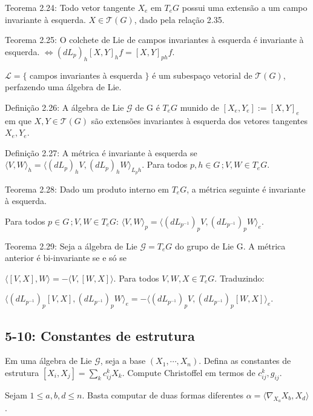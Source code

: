 \documentclass[12pt]{article}
\begin{document}
		Teorema 2.24: Todo vetor tangente $X_e$ em $T_eG$ possui uma extens\~ao a um campo invariante \`a esquerda. $X \in \mathcal{T}(G)$, dado pela rela\c{c}\~ao 2.35.

		Teorema 2.25: O colchete de Lie de campos invariantes \`a esquerda \'e invariante \`a esquerda. $\Leftrightarrow (dL_p)_h [X,Y]_h f = [X,Y]_{ph} f$.

		$\mathcal{L} = \{$ campos invariantes \`a esquerda $\}$ \'e um subespa\c{c}o vetorial de $\mathcal{T}(G)$, perfazendo uma \'algebra de Lie.

		Defini\c{c}\~ao 2.26: A \'algebra de Lie $\mathcal{G}$ de G \'e $T_eG$ munido de $[X_e, Y_e] := [X,Y]_e$ em que $X, Y \in \mathcal{T}(G)$ s\~ao extens\~oes invariantes \`a esquerda dos vetores tangentes $X_e, Y_e$.

		Defini\c{c}\~ao 2.27: A m\'etrica \'e invariante \`a esquerda se $\langle V, W \rangle_h = \langle (dL_p)_h V, (dL_p)_h W \rangle_{L_p h}$. Para todos $p,h \in G\,; V, W \in T_eG$.

		Teorema 2.28: Dado um produto interno em $T_eG$, a m\'etrica seguinte \'e invariante \`a esquerda.

		Para todos $p \in G\,; V, W \in T_eG$: $\langle V, W \rangle_p = \langle (dL_{p^{-1}})_p V, (dL_{p^{-1}})_p W \rangle_e$.

		Teorema 2.29: Seja a \'algebra de Lie $\mathcal{G} = T_eG$ do grupo de Lie G. A m\'etrica anterior \'e bi-invariante se e s\'o se

		$\langle [V, X], W \rangle = - \langle V, [W, X] \rangle$. Para todos $V, W, X \in T_eG$. Traduzindo:

		$\langle (dL_{p^{-1}})_p [V,X], (dL_{p^{-1}})_p W \rangle_e = - \langle (dL_{p^{-1}})_p V, (dL_{p^{-1}})_p [W,X] \rangle_e$.

		\subsection{5-10: Constantes de estrutura}
		\begin{flushright}
		\end{flushright}

		Em uma \'algebra de Lie $\mathcal{G}$, seja a base $(X_1, \cdots, X_n)$. Defina as constantes de estrutura $[X_i, X_j] = \sum_k c_{ij}^k X_k$. Compute Christoffel em termos de $c_{ij}^k, g_{ij}$.

		\vspace{3mm}

		Sejam $1 \le a,b,d \le n$. Basta computar de duas formas diferentes $\alpha = \langle \nabla_{X_a} X_b, X_d \rangle$.
\end{document}
